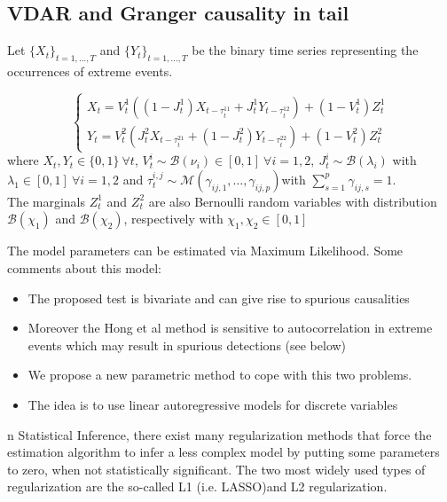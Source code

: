 \subsection{VDAR and Granger causality in tail}
Let $\{X_t\}_{t = 1,\ldots,T}$ and $\{Y_t\}_{t =1,\ldots,T}$ be the binary time series representing the occurrences of extreme events.
\begin{mydefinition}
\[
\begin{cases}
	X_t = V_t^1 ((1-J^1_t)X_{t-\tau_t^{11}} + J_t^1 Y_{t -\tau_t^{12}}) + (1-V^1_t)Z_t^1\\
	Y_t = V^2_t(J^2_t X_{t - \tau_t^{21}} + (1-J^2_t)Y_{t -\tau_t^{22}}) + (1-V^2_t)Z_t^2
\end{cases}
\]
where $X_t,Y_t \in \{0,1\} \ \forall t$, $V_t^i \sim \mathcal{B}(\nu_i)\in [0,1] \ \forall i =1,2, \ J_t^i \sim \mathcal{B}(\lambda_i)$ with $\lambda_1 \in [0,1] \ \forall i = 1,2$ and $\tau_t^{i,j} \sim \mathcal{M}(\gamma_{ij,1},\ldots, \gamma_{ij,p})$with $\sum_{s=1}^p \gamma_{ij,s}=1$. \\ The marginals $Z_t^1$ and $Z_t^2$ are also Bernoulli random variables with distribution $\mathcal{B}(\chi_1)$ and $\mathcal{B}(\chi_2)$, respectively with $\chi_1, \chi_2 \in [0,1]$
\end{mydefinition}
The model parameters can be estimated via Maximum Likelihood.
Some comments about this model:
\begin{itemize}
\item The proposed test is bivariate and can give rise to spurious causalities 
\item Moreover the Hong et al method is sensitive to autocorrelation in extreme events which may result in spurious detections (see below) 
\item We propose a new parametric method to cope with this two problems.
\item The idea is to use linear autoregressive models for discrete variables
\end{itemize}
n Statistical Inference, there exist many regularization methods that force the estimation algorithm to infer a less complex model by putting some parameters to zero, when not statistically significant. The two most widely used types of regularization are the
so-called L1 (i.e. LASSO)and L2 regularization.